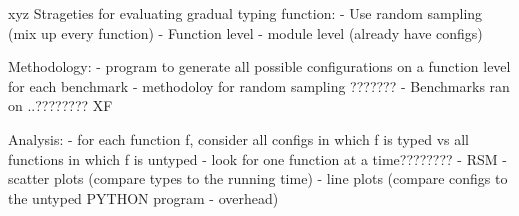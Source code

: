 xyz
Strageties for evaluating gradual typing function:
- Use random sampling (mix up every function)
- Function level
- module level (already have configs)


Methodology:
- program to generate all possible configurations on a function level for each benchmark
- methodoloy for random sampling ???????
- Benchmarks ran on ..????????
XF

Analysis:
- for each function f, consider all configs in which f is typed vs all functions in which f is untyped
- look for one function at a time????????
- RSM 
- scatter plots (compare types to the running time)
- line plots (compare configs to the untyped PYTHON program - overhead)


